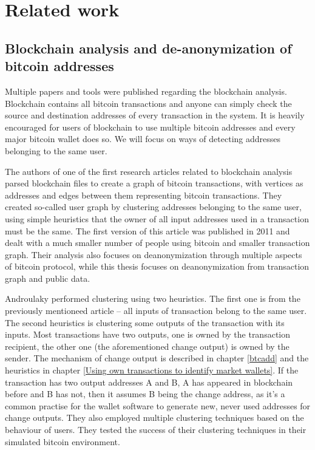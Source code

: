 \documentclass[
  digital, %
  table,   %
  lof,     %
  lot,     %
  oneside
]{fithesis3}
\begin{document}
\chapter{Related work}
\section{Blockchain analysis and de-anonymization of bitcoin addresses}

Multiple papers and tools were published regarding the blockchain analysis.
Blockchain contains all bitcoin transactions and anyone can simply check
the source and destination addresses of every transaction in the system.
It is heavily encouraged for users of blockchain to use multiple bitcoin addresses
 and every major bitcoin wallet does so.
 We will focus on ways of detecting addresses belonging to the same user.
 
The authors of one \cite{reid2013analysis} of the first research articles related to blockchain analysis
 parsed blockchain files to create a graph of bitcoin transactions, with vertices as addresses
and edges between them representing bitcoin transactions.
 They created so-called user graph by clustering addresses belonging to the same user, using
 simple heuristics that the owner of all input addresses used in a transaction must be the same. The first version of this article  
was published in 2011 and dealt with a much smaller number of people using bitcoin and smaller transaction graph.
Their analysis also focuses on deanonymization through multiple aspects of bitcoin protocol,
while this thesis focuses on deanonymization from transaction graph and public data.

Androulaky \cite{androulaki2013evaluating} performed clustering using two heuristics.
The first one is from the previously mentioneed article \cite{reid2013analysis} -- all inputs of transaction
belong to the same user. The second heuristics is clustering some outputs of the transaction with its inputs.
Most transactions have two outputs, one is owned by the transaction recipient,
the other one (the aforementioned change output) is owned by
the sender. The mechanism of change output is described in chapter \ref{btcadd} and the heuristics in
chapter \ref{Using own transactions to identify market wallets}.
If the transaction has two output addresses A and B, A has appeared in blockchain
before and B has not, then it assumes B being the change address, as it's a common practise
for the wallet software to generate new, never used addresses for change outputs.
They also employed multiple clustering techniques based on the behaviour of users.
 They tested the success of their clustering techniques in their simulated bitcoin 
 environment.
\end{document}
